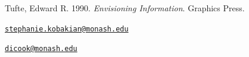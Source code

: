 \leavevmode\hypertarget{ref-EI}{}%
Tufte, Edward R. 1990. \emph{Envisioning Information}. Graphics Press.



\address{%
Stephanie Kobakian\\
Queensland University of Technology\\
\\
}
\href{mailto:stephanie.kobakian@monash.edu}{\nolinkurl{stephanie.kobakian@monash.edu}}

\address{%
Dianne Cook\\
Monash University\\
\\
}
\href{mailto:dicook@monash.edu}{\nolinkurl{dicook@monash.edu}}

